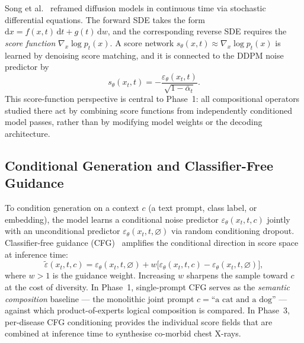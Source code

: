 Song et al.~\citep{song2021scorebased} reframed diffusion models in continuous time via
stochastic differential equations. The forward SDE takes the form $\mathrm{d}x =
f(x,t)\,\mathrm{d}t + g(t)\,\mathrm{d}w$, and the corresponding reverse SDE requires
the \emph{score function} $\nabla_x \log p_t(x)$. A score network $s_\theta(x,t) \approx
\nabla_x \log p_t(x)$ is learned by denoising score matching, and it is connected to the
DDPM noise predictor by
\begin{equation}
    s_\theta(x_t, t) = -\frac{\varepsilon_\theta(x_t, t)}{\sqrt{1-\bar\alpha_t}}.
    \label{eq:score_noise}
\end{equation}
This score-function perspective is central to Phase~1: all compositional operators studied
there act by combining score functions from independently conditioned model passes, rather
than by modifying model weights or the decoding architecture.

\subsection{Conditional Generation and Classifier-Free Guidance}

To condition generation on a context $c$ (a text prompt, class label, or embedding), the
model learns a conditional noise predictor $\varepsilon_\theta(x_t, t, c)$ jointly with an
unconditional predictor $\varepsilon_\theta(x_t, t, \varnothing)$ via random conditioning
dropout. Classifier-free guidance (CFG)~\citep{ho2022classifier} amplifies the conditional
direction in score space at inference time:
\begin{equation}
    \tilde\varepsilon(x_t, t, c)
    = \varepsilon_\theta(x_t, t, \varnothing)
    + w\bigl[\varepsilon_\theta(x_t, t, c) - \varepsilon_\theta(x_t, t, \varnothing)\bigr],
    \label{eq:cfg}
\end{equation}
where $w > 1$ is the guidance weight. Increasing $w$ sharpens the sample toward $c$ at the
cost of diversity. In Phase~1, single-prompt CFG serves as the \emph{semantic composition}
baseline --- the monolithic joint prompt $c = \text{``a cat and a dog''}$ --- against which
product-of-experts logical composition is compared. In Phase~3, per-disease CFG conditioning
provides the individual score fields that are combined at inference time to synthesise
co-morbid chest X-rays.
